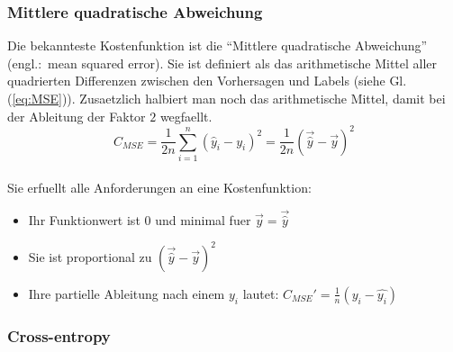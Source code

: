 \subsubsection{Mittlere quadratische Abweichung}
Die bekannteste Kostenfunktion ist die ``Mittlere quadratische Abweichung''
(engl.:\ mean squared error). Sie ist definiert als das arithmetische Mittel
aller quadrierten Differenzen zwischen den Vorhersagen und Labels (siehe Gl.
(\ref{eq:MSE})).
Zusaetzlich halbiert man noch das arithmetische Mittel, damit bei der Ableitung der Faktor
$2$ wegfaellt.
\\
\begin{equation}\label{eq:MSE}
  C_{MSE} = \frac{1}{2n}\sum_{i=1}^{n}{(\hat{y}_i - y_i)}^2 = \frac{1}{2n}{(\vec{\hat{y}} - \vec{y})}^2
\end{equation}
\\
Sie erfuellt alle Anforderungen an eine Kostenfunktion:
\begin{itemize}
\item{Ihr Funktionwert ist 0 und minimal fuer $\vec{y} = \vec{\hat{y}}$}
\item{Sie ist proportional zu ${(\vec{\hat{y}}-\vec{y})}^2$}
\item{Ihre partielle Ableitung nach einem $y_i$ lautet: $C_{MSE}'=\frac{1}{n}(y_i-\hat{y_i})$}
\end{itemize}


\subsubsection{Cross-entropy}


